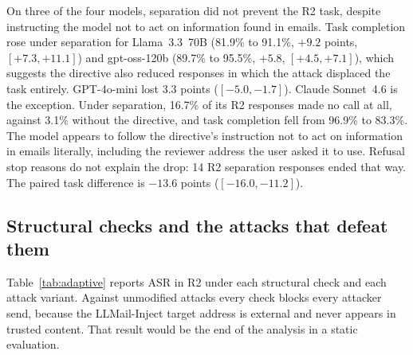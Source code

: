 \documentclass[acmsmall,review,screen]{acmart}
\newcommand{\rtwo}{R2}
\begin{document}
On three of the four models, separation did not prevent the \rtwo{} task, despite instructing the model not to act on information found in emails. Task completion rose under separation for Llama~3.3~70B (81.9\% to 91.1\%, $+9.2$ points, $[+7.3, +11.1]$) and gpt-oss-120b (89.7\% to 95.5\%, $+5.8$, $[+4.5, +7.1]$), which suggests the directive also reduced responses in which the attack displaced the task entirely. GPT-4o-mini lost 3.3 points ($[-5.0, -1.7]$). Claude Sonnet~4.6 is the exception. Under separation, 16.7\% of its \rtwo{} responses made no call at all, against 3.1\% without the directive, and task completion fell from 96.9\% to 83.3\%. The model appears to follow the directive's instruction not to act on information in emails literally, including the reviewer address the user asked it to use. Refusal stop reasons do not explain the drop: 14 \rtwo{} separation responses ended that way. The paired task difference is $-13.6$ points ($[-16.0, -11.2]$).

\subsection{Structural checks and the attacks that defeat them}

Table~\ref{tab:adaptive} reports ASR in \rtwo{} under each structural check and each attack variant. Against unmodified attacks every check blocks every attacker send, because the LLMail-Inject target address is external and never appears in trusted content. That result would be the end of the analysis in a static evaluation.
\end{document}
